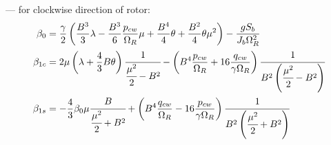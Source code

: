 --- for clockwise direction of rotor:
\begin{align}
  \beta_0 &=
  \frac{\gamma}{2}
  \left(
      \frac{B^3}{3} \lambda 
    - \frac{B^3}{6} \frac{p_{cw}}{\Omega_R} \mu
    + \frac{B^4}{4} \theta
    + \frac{B^2}{4} \theta \mu^2
  \right) - \frac{ g S_b }{ J_b \Omega_R^2 }
  \\
  \beta_{1c} &=
  2 \mu \left( \lambda + \frac{4}{3} B \theta \right)
  \cfrac{1}{\cfrac{\mu^2}{2} - B^2}
  -
  \left(
      B^4 \frac{p_{cw}}{\Omega_R}
    + 16 \frac{q_{cw}}{\gamma \Omega_R}
  \right)
  \cfrac{1}{B^2\left(\cfrac{\mu^2}{2}-B^2\right)}
  \\
  \beta_{1s} &=
  - \frac{4}{3} \beta_0 \mu
  \cfrac{B}{\cfrac{\mu^2}{2} + B^2}
  +
  \left(
      B^4 \frac{q_{cw}}{\Omega_R} 
    - 16 \frac{p_{cw}}{\gamma \Omega_R}
  \right)
  \cfrac{1}{B^2 \left(\cfrac{\mu^2}{2}+B^2\right)}
\end{align}
